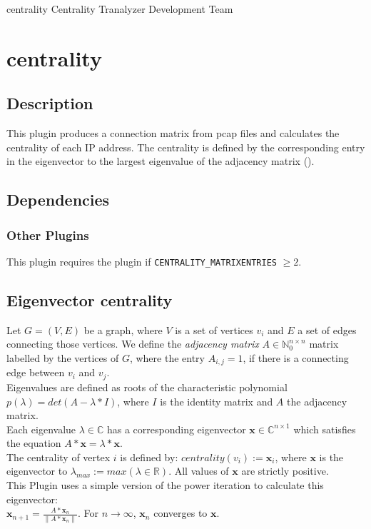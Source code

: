 \documentclass[documentation]{subfiles}
\begin{document}
\trantitle
    {centrality}
    {Centrality}
    {Tranalyzer Development Team}

\section{centrality}\label{s:centrality}

\subsection{Description}
This plugin produces a connection matrix from pcap files and calculates the centrality
of each IP address. The centrality is defined by the corresponding entry in the eigenvector to the largest eigenvalue of the adjacency matrix ().

\subsection{Dependencies}

\subsubsection{Other Plugins}
This plugin requires the  plugin if {\tt CENTRALITY\_MATRIXENTRIES} $\geq 2$.

\subsection{Eigenvector centrality}\label{s:eigenvector-centrality}
Let $G=(V,E)$ be a graph, where $V$ is a set of vertices $v_i$ and $E$ a set of edges connecting those vertices. We define the \emph{adjacency matrix} $A \in\mathbb{N}_0^{n\times n}$ matrix labelled by the vertices of $G$, where the entry $A_{i,j}=1$, if there is a connecting edge between $v_i$ and $v_j$.\\
Eigenvalues are defined as roots of the characteristic polynomial $p(\lambda) = det(A-\lambda*I)$, where $I$ is the identity matrix and $A$ the adjacency matrix.\\
Each eigenvalue $\lambda \in \mathbb{C}$ has a corresponding eigenvector $\mathbf{x} \in \mathbb{C}^{n\times1}$ which satisfies the equation $A*\mathbf{x}=\lambda*\mathbf{x}$.\\
The centrality of vertex $i$ is defined by: $centrality(v_i):=\mathbf{x}_i$, where $\mathbf{x}$ is the eigenvector to $\lambda_{max} := max(\lambda \in \mathbb{R})$.
All values of $\mathbf{x}$ are strictly positive.\\
This Plugin uses a simple version of the power iteration to calculate this eigenvector: \\
$\mathbf{x}_{n+1} = \frac{A*\mathbf{x}_n}{\|A*\mathbf{x}_n\|}$. For $n \to \infty$, $\mathbf{x}_n$ converges to $\mathbf{x}$.
\end{document}
